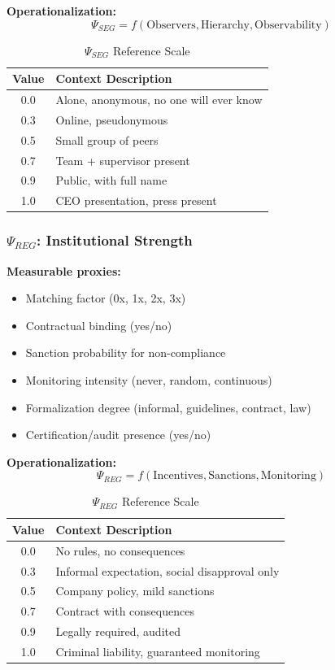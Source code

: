 \textbf{Operationalization:}
\begin{equation}
\Psi_{SEG} = f(\text{Observers}, \text{Hierarchy}, \text{Observability})
\end{equation}

\begin{table}[htbp]
\centering
\caption{$\Psi_{SEG}$ Reference Scale}
\begin{tabular}{@{}cl@{}}
\toprule
\textbf{Value} & \textbf{Context Description} \\
\midrule
0.0 & Alone, anonymous, no one will ever know \\
0.3 & Online, pseudonymous \\
0.5 & Small group of peers \\
0.7 & Team + supervisor present \\
0.9 & Public, with full name \\
1.0 & CEO presentation, press present \\
\bottomrule
\end{tabular}
\end{table}

\subsubsection{$\Psi_{REG}$: Institutional Strength}

\textbf{Measurable proxies:}
\begin{itemize}
\item Matching factor (0x, 1x, 2x, 3x)
\item Contractual binding (yes/no)
\item Sanction probability for non-compliance
\item Monitoring intensity (never, random, continuous)
\item Formalization degree (informal, guidelines, contract, law)
\item Certification/audit presence (yes/no)
\end{itemize}

\textbf{Operationalization:}
\begin{equation}
\Psi_{REG} = f(\text{Incentives}, \text{Sanctions}, \text{Monitoring})
\end{equation}

\begin{table}[htbp]
\centering
\caption{$\Psi_{REG}$ Reference Scale}
\begin{tabular}{@{}cl@{}}
\toprule
\textbf{Value} & \textbf{Context Description} \\
\midrule
0.0 & No rules, no consequences \\
0.3 & Informal expectation, social disapproval only \\
0.5 & Company policy, mild sanctions \\
0.7 & Contract with consequences \\
0.9 & Legally required, audited \\
1.0 & Criminal liability, guaranteed monitoring \\
\bottomrule
\end{tabular}
\end{table}

